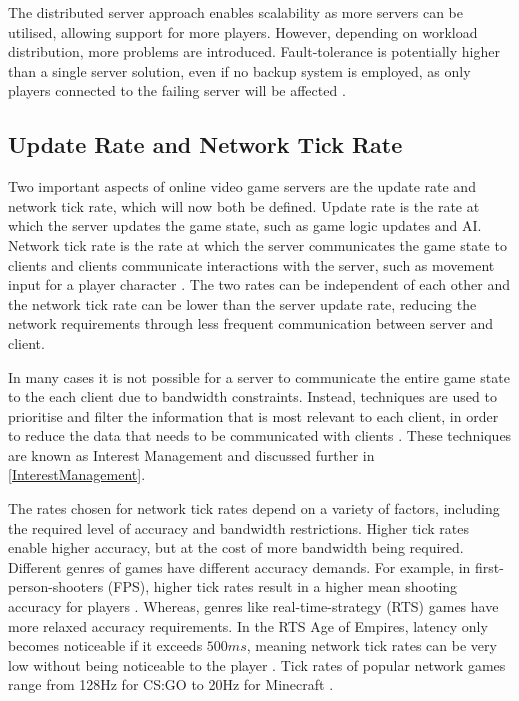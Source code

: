 The distributed server approach enables scalability as more servers can be utilised, allowing support for more players. However, depending on workload distribution, more problems are introduced. Fault-tolerance is potentially higher than a single server solution, even if no backup system is employed, as only players connected to the failing server will be affected \cite{P2PForMMOs}.


\subsection{Update Rate and Network Tick Rate} \label{update-rate-test-values}

Two important aspects of online video game servers are the update rate and network tick rate, which will now both be defined. Update rate is the rate at which the server updates the game state, such as game logic updates and AI. Network tick rate is the rate at which the server communicates the game state to clients and clients communicate interactions with the server, such as movement input for a player character \cite{pisan2004challenges}. The two rates can be independent of each other and the network tick rate can be lower than the server update rate, reducing the network requirements through less frequent communication between server and client.

In many cases it is not possible for a server to communicate the entire game state to the each client due to bandwidth constraints. Instead, techniques are used to prioritise and filter the information that is most relevant to each client, in order to reduce the data that needs to be communicated with clients \cite{pisan2004challenges}. These techniques are known as Interest Management and discussed further in \ref{InterestManagement}.

The rates chosen for network tick rates depend on a variety of factors, including the required level of accuracy and bandwidth restrictions. Higher tick rates enable higher accuracy, but at the cost of more bandwidth being required. Different genres of games have different accuracy demands. For example, in first-person-shooters (FPS), higher tick rates result in a higher mean shooting accuracy for players \cite{lee2015evaluation}. Whereas, genres like real-time-strategy (RTS) games have more relaxed accuracy requirements. In the RTS Age of Empires, latency only becomes noticeable if it exceeds $500ms$, meaning network tick rates can be very low without being noticeable to the player \cite{pisan2004challenges}. Tick rates of popular network games range from 128Hz for CS:GO to 20Hz for Minecraft \cite{metzger2016comprehensive}.


